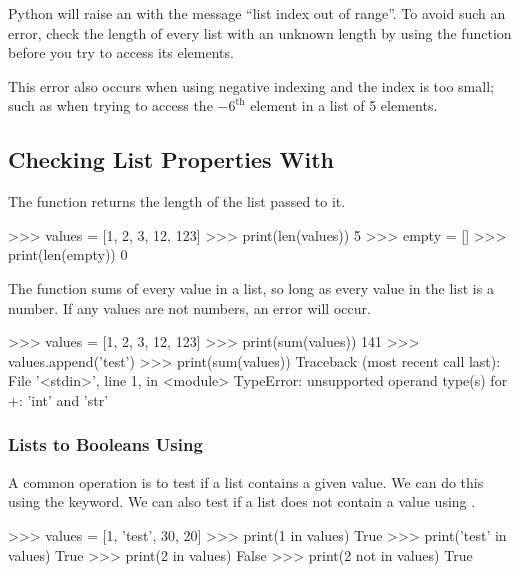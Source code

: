 \documentclass[11pt]{cselabheader}
\begin{document}
Python will raise an  with the message
``list index out of range''. To avoid such an error, check the length
of every list with an unknown length by using the 
function before you try to access its elements.

This error also occurs when using negative indexing and the index is
too small; such as when trying to access the $-6^\text{th}$ element in
a list of 5 elements.

\subsection{\texorpdfstring%
  {Checking List Properties With }
  {Checking List Properties With len, sum}}
The  function returns the length of the list passed to it.

\begin{pyconcode}
>>> values = [1, 2, 3, 12, 123]
>>> print(len(values))
5
>>> empty = []
>>> print(len(empty))
0

\end{pyconcode}

The  function sums of every value in a
list, so long as every value in the list is a number. If any values
are not numbers, an error will occur.

\begin{pyconcode}
>>> values = [1, 2, 3, 12, 123]
>>> print(sum(values))
141
>>> values.append('test')
>>> print(sum(values))
Traceback (most recent call last):
  File '<stdin>', line 1, in <module>
TypeError: unsupported operand type(s) for +: 'int' and 'str'

\end{pyconcode}


\subsubsection{Lists to Booleans Using }

A common operation is to test if a list contains a given value. We can do this
using the  keyword. We can also test if a list does not contain a
value using .

\begin{pyconcode}
>>> values = [1, 'test', 30, 20]
>>> print(1 in values)
True
>>> print('test' in values)
True
>>> print(2 in values)
False
>>> print(2 not in values)
True

\end{pyconcode}
\end{document}
